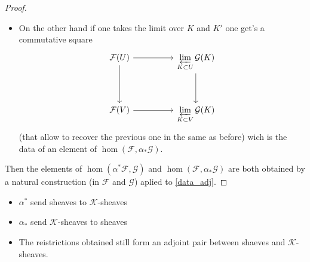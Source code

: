 \begin{proof}
\begin{itemize}
    \item On the other hand if one takes the limit over $K$ and $K'$ one get's a commutative square 
$$\begin{tikzcd}
	{\mathcal{F}(U)} && {\varprojlim\limits_{K\subset U}\mathcal{G}(K)} \\
	\\
	{\mathcal{F}(V)} && {\varprojlim\limits_{K\subset V}\mathcal{G}(K)}
	\arrow[from=1-1, to=1-3]
	\arrow[from=1-1, to=3-1]
	\arrow[from=1-3, to=3-3]
	\arrow[from=3-1, to=3-3]
\end{tikzcd}$$ (that allow to recover the previous one in the same as before) wich is the data of an element of $\hom(\mathcal{F},\alpha_*\mathcal{G})$.
\end{itemize}
    Then the elements of $\hom(\alpha^*\mathcal{F},\mathcal{G})$ and $\hom(\mathcal{F},\alpha_*\mathcal{G})$ are both obtained by a natural construction (in $\mathcal{F}$ and $\mathcal{G}$) aplied to \eqref{data_adj}.
\end{proof}

\begin{lemma}\label{lem:adj_kshv_and_shv}
    \begin{itemize}
        \item $\alpha^*$ send sheaves to $\mathcal{K}$-sheaves
        \item $\alpha_*$ send $\mathcal{K}$-sheaves to sheaves
        \item The reistrictions obtained still form an adjoint pair between shaeves and $\mathcal{K}$-sheaves.
    \end{itemize}
\end{lemma}

